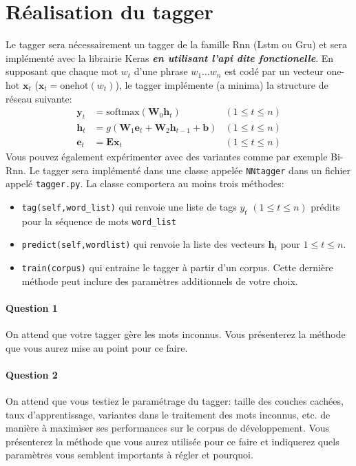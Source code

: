 \documentclass[a4paper,11pt]{article}
\begin{document}
\section{Réalisation du tagger}
Le tagger sera nécessairement un tagger de la famille {\sc Rnn} ({\sc Lstm} ou 
{\sc Gru}) et sera implémenté avec la librairie Keras {\bf\em en utilisant l'{\sc api} dite fonctionelle}. En supposant que chaque mot $w_t$ d'une phrase $w_1\ldots w_n$ est codé par un vecteur one-hot $\mathbf{x}_t$ ($\mathbf{x}_t = \text{onehot}(w_t)$), 
le tagger implémente (a minima) la structure de réseau suivante:
\begin{align*}
\mathbf{y}_t &= \text{softmax}(\mathbf{W}_0 \mathbf{h}_t)  &(1 \leq t \leq n)\\
\mathbf{h}_t &= g(\mathbf{W}_1\mathbf{e}_t + \mathbf{W}_2
\mathbf{h}_{t-1}+\mathbf{b} )  &(1 \leq t \leq n)\\
\mathbf{e}_t &= \mathbf{E}\mathbf{x}_t  &(1 \leq t \leq n)
\end{align*}
Vous pouvez également expérimenter avec des variantes comme par exemple {\sc Bi-Rnn}. Le tagger sera implémenté dans une classe appelée \verb+NNtagger+  dans un fichier appelé \verb+tagger.py+.
La classe comportera au moins trois méthodes:
\begin{itemize}
\item \verb+tag(self,word_list)+ qui renvoie une liste de tags $y_t$ $(1\leq t\leq n)$ prédits pour la séquence de mots  \verb+word_list+ 
\item \verb+predict(self,wordlist)+ qui renvoie la liste des vecteurs $\mathbf{h}_t$ pour $1\leq t\leq n$.
\item \verb+train(corpus)+ qui entraine le tagger à partir d'un corpus. Cette dernière méthode peut inclure des paramètres additionnels de votre choix.
\end{itemize}

\paragraph{Question 1} On attend que votre tagger gère les mots inconnus. Vous présenterez la méthode que vous aurez mise au point pour ce faire.
\paragraph{Question 2} On attend que vous testiez le paramétrage du tagger: taille des couches cachées, taux d'apprentissage, variantes dans le traitement des mots inconnus, etc. de manière à maximiser ses performances sur le corpus de développement. Vous présenterez la méthode que vous aurez utilisée pour ce faire et indiquerez quels paramètres vous semblent importants à régler et pourquoi.
\end{document}
